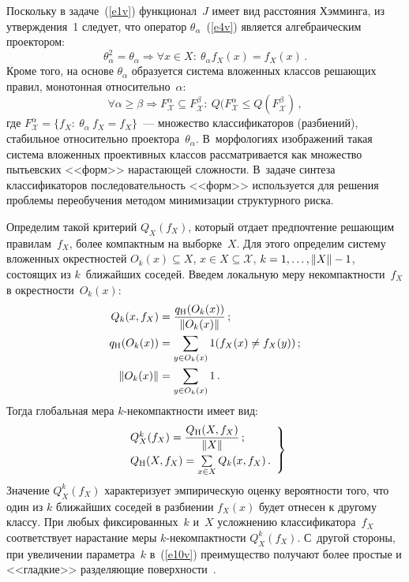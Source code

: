 \begin{multicols}{2}
Поскольку в задаче~(\ref{e1v}) функционал~$J$ имеет вид расстояния Хэмминга, из 
утверждения~1 следует, что оператор $\theta_\alpha$~(\ref{e4v}) является алгебраическим 
проектором:
\begin{equation*}
\theta_\alpha^2=\theta_\alpha\Rightarrow \forall x\in X:\ \theta_{\alpha} f_X(x)=f_X(x)\,.
\end{equation*}
Кроме того, на основе $\theta_\alpha$ образуется система вложенных классов решающих правил, 
монотонная относительно~$\alpha$: 
\begin{equation*}
\forall \alpha \geq \beta \Rightarrow F^\alpha_{\mathcal{X}}\subseteq F^\beta_{\mathcal{X}}:\ 
Q(F^\alpha_{\mathcal{X}}\leq Q(F^\beta_{\mathcal{X}})\,,
\end{equation*}
где $F^\alpha_{\mathcal{X}}= \{ f_X:\ \theta_\alpha\ f_X=f_X\}$~--- множество классификаторов 
(разбиений), стабильное относительно проектора~$\theta_\alpha$. В~морфологиях изображений 
такая система вложенных проективных классов рас\-смат\-ри\-ва\-ет\-ся как множество пытьевских 
<<форм>> на\-рас\-та\-ющей сложности. В~задаче синтеза классификаторов последовательность 
<<форм>> используется для решения проблемы переобучения методом минимизации 
структурного риска.

Определим такой критерий $Q_X(f_X)$, который отдает предпочтение решающим 
правилам~$f_X$, более компактным на выборке~$X$. Для этого определим систему вложенных 
окрестностей $O_k(x)\subseteq X$, $x\in X\subseteq \mathcal{X}$, $k\hm=1, \ldots , \Vert X\Vert\hm-
1$, состоящих из $k$~ближайших соседей. Введем локальную меру некомпактности~$f_X$ в 
окрестности~$O_k(x)$:
\begin{align*}
Q_k(x, f_X) &= \displaystyle\frac{\displaystyle q_{\mathrm{H}}(O_k(x))\mathstrut}{\displaystyle \Vert O_k(x)\Vert\mathstrut}\,;\\
q_{\mathrm{H}}(O_k(x)) &= \sum\limits_{y\in O_k(x)} 1(f_X(x)\not= f_X(y))\,;\\
\Vert O_k(x)\Vert &= \sum\limits_{y\in O_k(x)} 1\,.
\end{align*}
Тогда глобальная мера $k$-не\-ком\-пакт\-ности имеет вид:
\begin{equation}
\left.
\begin{array}{l}
Q^k_X(f_X)=\displaystyle\frac{\displaystyle Q_{\mathrm{H}}(X, f_X)\mathstrut}{\displaystyle \Vert X\Vert\mathstrut}\,;\\[9pt]
Q_{\mathrm{H}}(X, f_X)=\sum\limits_{x\in X} Q_k(x, f_X)\,.
\end{array}
\right\}
\label{e10v}
\end{equation}
Значение $Q^k_X(f_X)$ характеризует эмпирическую оценку вероятности того, что 
один из $k$ ближайших соседей в разбиении $f_X(x)$ будет отнесен к другому классу. При любых 
фиксированных~$k$ и~$X$ усложнению классификатора~$f_X$ соответствует нарастание меры 
$k$-не\-ком\-пакт\-ности $Q^k_X(f_X)$. С~другой стороны, при увеличении параметра~$k$ 
в~(\ref{e10v}) преимущество получают более простые и <<гладкие>> разделяющие 
поверхности~\cite{9v}.


\end{multicols}
